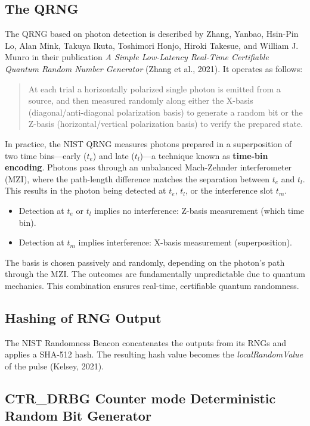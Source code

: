 \subsection{The QRNG}
The QRNG based on photon detection is described by Zhang, Yanbao, Hsin-Pin Lo, Alan Mink, Takuya Ikuta, Toshimori Honjo, Hiroki Takesue, and William J. Munro in their publication \textit{A Simple Low-Latency Real-Time Certifiable Quantum Random Number Generator} (Zhang et al., 2021). It operates as follows:

\begin{quote}
At each trial a horizontally polarized single photon is emitted from a source, and then measured randomly along either the X-basis (diagonal/anti-diagonal polarization basis) to generate a random bit or the Z-basis (horizontal/vertical polarization basis) to verify the prepared state.
\end{quote}

In practice, the NIST QRNG measures photons prepared in a superposition of two time bins---early ($t_e$) and late ($t_l$)---a technique known as \textbf{time-bin encoding}. Photons pass through an unbalanced Mach-Zehnder interferometer (MZI), where the path-length difference matches the separation between $t_e$ and $t_l$. This results in the photon being detected at $t_e$, $t_l$, or the interference slot $t_m$.

\begin{itemize}
    \item Detection at $t_e$ or $t_l$ implies no interference: Z-basis measurement (which time bin).
    \item Detection at $t_m$ implies interference: X-basis measurement (superposition).
\end{itemize}

The basis is chosen passively and randomly, depending on the photon's path through the MZI. The outcomes are fundamentally unpredictable due to quantum mechanics. This combination ensures real-time, certifiable quantum randomness.

\subsection{Hashing of RNG Output}
The NIST Randomness Beacon concatenates the outputs from its RNGs and applies a SHA-512 hash. The resulting hash value becomes the \textit{localRandomValue} of the pulse (Kelsey, 2021).

\subsection{CTR\_DRBG Counter mode Deterministic Random Bit Generator}
\label{sec:counter_mode_deterministic_random_bit_generator}

